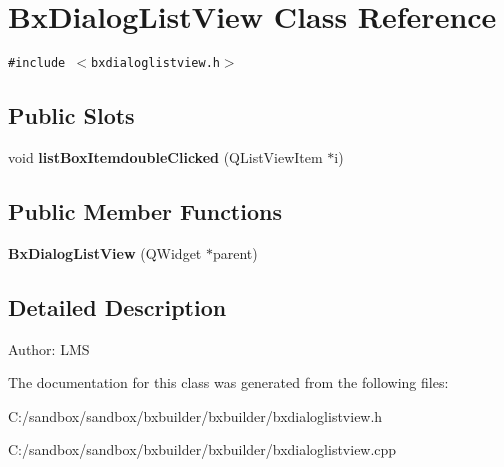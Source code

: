 \hypertarget{class_bx_dialog_list_view}{
\section{BxDialogListView Class Reference}
\label{class_bx_dialog_list_view}
}
{\tt \#include $<$bxdialoglistview.h$>$}

\subsection*{Public Slots}
\begin{CompactItemize}
\item 
\hypertarget{class_bx_dialog_list_view_3d5c574192654bc1ffef1858e1519347}{
void \textbf{listBoxItemdoubleClicked} (QListViewItem $\ast$i)}
\label{class_bx_dialog_list_view_3d5c574192654bc1ffef1858e1519347}

\end{CompactItemize}
\subsection*{Public Member Functions}
\begin{CompactItemize}
\item 
\hypertarget{class_bx_dialog_list_view_c7d9b9e8fc236a81226a17ce4c6d3fca}{
\textbf{BxDialogListView} (QWidget $\ast$parent)}
\label{class_bx_dialog_list_view_c7d9b9e8fc236a81226a17ce4c6d3fca}

\end{CompactItemize}


\subsection{Detailed Description}
\begin{Desc}
\item[Author:]LMS \end{Desc}


The documentation for this class was generated from the following files:\begin{CompactItemize}
\item 
C:/sandbox/sandbox/bxbuilder/bxbuilder/bxdialoglistview.h\item 
C:/sandbox/sandbox/bxbuilder/bxbuilder/bxdialoglistview.cpp\end{CompactItemize}

